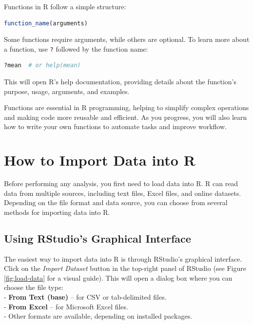 \documentclass[
]{book}
\newcommand{\passthrough}[1]{#1}
\theoremstyle{definition}
\theoremstyle{definition}
\theoremstyle{definition}
\theoremstyle{definition}
\theoremstyle{remark}
\begin{document}
Functions in R follow a simple structure:

\begin{lstlisting}[language=R]
function_name(arguments)
\end{lstlisting}

Some functions require arguments, while others are optional. To learn more about a function, use \passthrough{\lstinline!?!} followed by the function name:

\begin{lstlisting}[language=R]
?mean  # or help(mean)
\end{lstlisting}

This will open R's help documentation, providing details about the function's purpose, usage, arguments, and examples.

Functions are essential in R programming, helping to simplify complex operations and making code more reusable and efficient. As you progress, you will also learn how to write your own functions to automate tasks and improve workflow.

\section{How to Import Data into R}\label{how-to-import-data-into-r}

Before performing any analysis, you first need to load data into R. R can read data from multiple sources, including text files, Excel files, and online datasets. Depending on the file format and data source, you can choose from several methods for importing data into R.

\subsection*{Using RStudio's Graphical Interface}\label{using-rstudios-graphical-interface}

The easiest way to import data into R is through RStudio's graphical interface. Click on the \emph{Import Dataset} button in the top-right panel of RStudio (see Figure \ref{fig:load-data} for a visual guide). This will open a dialog box where you can choose the file type:\\
- \textbf{From Text (base)} -- for CSV or tab-delimited files.\\
- \textbf{From Excel} -- for Microsoft Excel files.\\
- Other formats are available, depending on installed packages.
\end{document}
